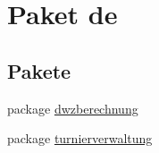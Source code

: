 \hypertarget{namespacede}{}\section{Paket de}
\label{namespacede}
\subsection*{Pakete}
\begin{DoxyCompactItemize}
\item 
package \hyperlink{namespacede_1_1dwzberechnung}{dwzberechnung}
\item 
package \hyperlink{namespacede_1_1turnierverwaltung}{turnierverwaltung}
\end{DoxyCompactItemize}
